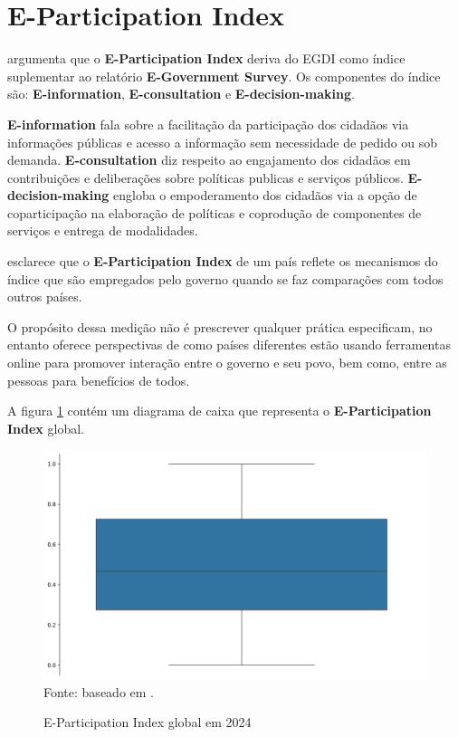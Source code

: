 \section{E-Participation Index}
\label{epart}

\cite{ONU_EGDI} argumenta que o \textbf{E-Participation Index} deriva do EGDI como índice suplementar ao relatório \textbf{E-Government Survey}. Os componentes do índice são: \textbf{E-information}, \textbf{E-consultation} e \textbf{E-decision-making}. 

\textbf{E-information} fala sobre a facilitação da participação dos cidadãos via informações públicas e acesso a informação sem necessidade de pedido ou sob demanda. \textbf{E-consultation} diz respeito ao engajamento dos cidadãos em contribuições e deliberações sobre políticas publicas e serviços públicos. \textbf{E-decision-making} engloba o empoderamento dos cidadãos via a opção de coparticipação na elaboração de políticas e coprodução de componentes de serviços e entrega de modalidades.

\cite{ONU_EGDI} esclarece que o \textbf{E-Participation Index} de um país reflete os mecanismos do índice que são empregados pelo governo quando se faz comparações com todos outros países. 

O propósito dessa medição não é prescrever qualquer prática especificam, no entanto oferece perspectivas de como países diferentes estão usando ferramentas online para promover interação entre o governo e seu povo, bem como, entre as pessoas para benefícios de todos.

A figura \ref{fig:boxplot_epart_global} contém um diagrama de caixa que representa o \textbf{E-Participation Index} global.

\begin{figure}[H]
	\centering
	\caption{E-Participation Index global em 2024}
	\includegraphics[width=1\linewidth]{figuras/egdi/boxplot_epart_global.png}
	\label{fig:boxplot_epart_global}
	\footnotesize{Fonte: baseado em \cite{ONU_EGDI_mapa}.}
\end{figure}

